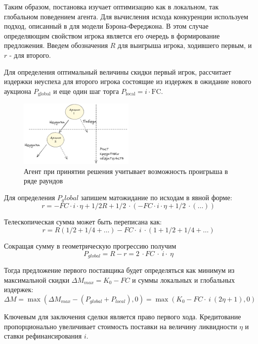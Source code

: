 Таким образом, постановка изучает оптимизацию как в локальном, так  глобальном поведением агента. Для вычисления исхода конкуренции используем подход, описанный в \cite{Bogdanov2023} для модели Бэрона-Фереджона. В этом случае определяющим свойством игрока является его очередь в формирование предложения. Введем обозначения $R$ для  выигрыша игрока, ходившего первым, и  $r$ - для второго.

Для определения оптимальный величины скидки первый игрок, рассчитает издержки неуспеха для  второго игрока состоящие из издержек в ожидание нового аукциона $P_\text{global}$ и еще один шаг торга $P_\text{local}= i \cdot \text{FC}$.

\begin{figure}[h]
    \centering
    \includegraphics[width=0.5\textwidth]{assets/settings/dynamic.excalidraw.png}
    \caption{Агент при принятии решения учитывает возможность проигрыша в ряде раундов}
\end{figure}

Для определения $P_global$ запишем матожидание по исходам в явной форме:
\begin{equation}
    r  = - FC \cdotp i \cdotp \eta  + 1/ 2 R  + 1/2 \ \cdotp (- FC \cdotp i \cdotp \eta  + 1/2 \ \cdotp (\dots))
\end{equation}

Телескопическая сумма может быть переписана как:
\begin{equation}
    r = R (1/2 + 1/4 + \dots)  - FC \cdotp \ i \ \cdotp (1 +1/2 +1/4 + \dots)    
\end{equation}
    

Сокращая сумму в геометрическую прогрессию получим 
\begin{equation}
    P_{global}= R-r = 2 \ \cdotp FC \ \cdotp \ i \cdotp \ \eta
\end{equation}

Тогда предложение первого поставщика будет определяться как минимум из максимальной скидки $\Delta M_{max} = K_0-FC $ и суммы локальных и глобальных издержек:
\begin{equation}
    \Delta M = \max(\Delta M_{max} - (P_{global} + P_{local}),0) = \max(K_0 - FC \cdotp \ i \ (2 \eta + 1),0)
\end{equation}

Ключевым для заключения сделки является право первого хода. Кредитование пропорционально увеличивает стоимость поставки на величину ликвидности $\eta$ и ставки рефинансирования $i$.
